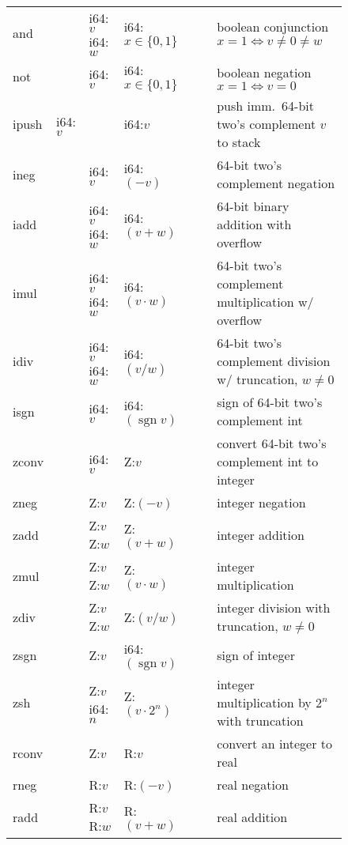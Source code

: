 \documentclass[a4paper,parskip=half]{scrartcl}
\begin{document}
\begin{figure}[h]
\begin{tabular}{l|l|l|l@{\;\,\vline\,}c@{\,\vline\,}c@{\,\vline\;\,}p{9cm}}
  \ttfamily and   &         & i64:$v$ i64:$w$ & i64:$x\in\{0,1\}$ &&& boolean conjunction $x=1\iff v\neq0\neq w$ \\
  \ttfamily not   &         & i64:$v$         & i64:$x\in\{0,1\}$ &&& boolean negation $x=1\iff v=0$ \\
  \hline
  \ttfamily ipush & i64:$v$ &                 & i64:$v$          && & push imm.\ 64-bit two's complement $v$ to stack \\
  \ttfamily ineg  &         & i64:$v$         & i64:$(-v)$       && & 64-bit two's complement negation \\
  \ttfamily iadd  &         & i64:$v$ i64:$w$ & i64:$(v+w)$      && & 64-bit binary addition with overflow \\
  \ttfamily imul  &         & i64:$v$ i64:$w$ & i64:$(v\cdot w)$ && & 64-bit two's complement multiplication w/ overflow \\
  \ttfamily idiv  &         & i64:$v$ i64:$w$ & i64:$(v/w)$      && & 64-bit two's complement division w/ truncation, $w\neq0$ \\
  \ttfamily isgn  &         & i64:$v$         & i64:$(\operatorname{sgn}v)$ &&& sign of 64-bit two's complement int \\
  \hline
  \ttfamily zconv &         & i64:$v$         & Z:$v$            && & convert 64-bit two's complement int to integer \\
  \ttfamily zneg  &         & Z:$v$           & Z:$(-v)$         && & integer negation \\
  \ttfamily zadd  &         & Z:$v$ Z:$w$     & Z:$(v+w)$        && & integer addition \\
  \ttfamily zmul  &         & Z:$v$ Z:$w$     & Z:$(v\cdot w)$   && & integer multiplication \\
  \ttfamily zdiv  &         & Z:$v$ Z:$w$     & Z:$(v/w)$        && & integer division with truncation, $w\neq0$ \\
  \ttfamily zsgn  &         & Z:$v$           & i64:$(\operatorname{sgn}v)$ &&& sign of integer \\
  \ttfamily zsh   &         & Z:$v$ i64:$n$   & Z:$(v\cdot2^n)$  && & integer multiplication by $2^n$ with truncation \\
  \hline
  \ttfamily rconv &         & Z:$v$           & R:$v$           & && convert an integer to real \\
  \ttfamily rneg  &         & R:$v$           & R:$(-v)$        & && real negation \\
  \ttfamily radd  &         & R:$v$ R:$w$     & R:$(v+w)$       & && real addition \\

\end{tabular}
\end{figure}
\end{document}
